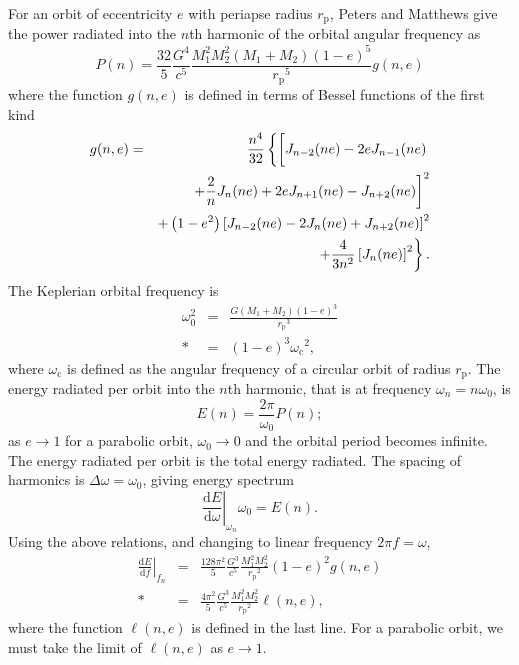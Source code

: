 \documentclass[aps,prd,amsfonts,amssymb,amsmath,reprint,showpacs,groupedaddress]{revtex4-1}
\newcommand{\sub}[1]{\ensuremath{_\text{#1}}}
\newcommand{\dd}{\ensuremath{\mathrm{d}}}
\newcommand{\diff}[2]{\ensuremath{\frac{\dd {#1}}{\dd {#2}}}}
\begin{document}
For an orbit of eccentricity $e$ with periapse radius $r\sub{p}$, Peters and Matthews\cite{Peters1963} give the power radiated into the $n$th harmonic of the orbital angular frequency as
\begin{equation}
P(n) = \frac{32}{5}\frac{G^4}{c^5}\frac{M_1^2M_2^2(M_1 + M_2)(1-e)^5}{r\sub{p}^5}g(n,e)
\label{eq:PM_P}
\end{equation}
where the function $g(n,e)$ is defined in terms of Bessel functions of the first kind
\begin{eqnarray}
g(n,e) & = & \frac{n^4}{32}\left\{\left[J_{n-2}(ne) - 2eJ_{n-1}(ne) \vphantom{\frac{2}{n}J_n(ne)} \right. \right. \nonumber \\*
 & & \left. + \frac{2}{n}J_n(ne) + 2eJ_{n+1}(ne) - J_{n+2}(ne)\right]^2 \nonumber \\*
 & & + \left(1 - e^2\right)\left[J_{n-2}(ne) - 2J_n(ne) + J_{n+2}(ne)\right]^2 \nonumber \\*
 & & \left. + \frac{4}{3n^2}\left[J_n(ne)\right]^2\right\}.
\end{eqnarray}
The Keplerian orbital frequency is
\begin{eqnarray}
\omega_0^2 & = & \frac{G(M_1 + M_2)(1-e)^3}{r\sub{p}^3}\\*
 & = & (1-e)^3\omega\sub{c}^2,
\label{eq:Kepler_freq}
\end{eqnarray}
where $\omega\sub{c}$ is defined as the angular frequency of a circular orbit of radius $r\sub{p}$. The energy radiated per orbit into the $n$th harmonic, that is at frequency $\omega_n = n\omega_0$, is
\begin{equation}
E(n) = \frac{2\pi}{\omega_0}P(n);
\label{eq:E(n)}
\end{equation}
as $e \rightarrow 1$ for a parabolic orbit, $\omega_0 \rightarrow 0$ and the orbital period becomes infinite. The energy radiated per orbit is the total energy radiated. The spacing of harmonics is $\Delta\omega = \omega_0$, giving energy spectrum
\begin{equation}
\left.\diff{E}{\omega}\right|_{\omega_n}\omega_0 = E(n).
\end{equation}
Using the above relations, and changing to linear frequency $2\pi f = \omega$,
\begin{eqnarray}
\left.\diff{E}{f}\right|_{f_n} & = & \frac{128\pi^2}{5}\frac{G^3}{c^5}\frac{M_1^2M_2^2}{r\sub{p}^2}(1-e)^2g(n,e) \\*
 & = & \frac{4\pi^2}{5}\frac{G^3}{c^5}\frac{M_1^2M_2^2}{r\sub{p}^2}\ell(n,e),
\label{eq:PM_spectrum}
\end{eqnarray}
where the function $\ell(n,e)$ is defined in the last line. For a parabolic orbit, we must take the limit of $\ell(n,e)$ as $e \rightarrow 1$.
\end{document}
